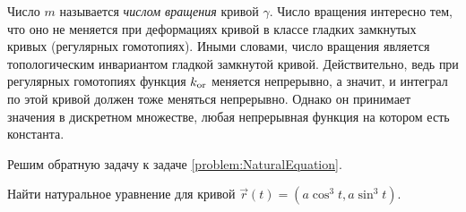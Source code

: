 Число $m$ называется \textit{числом вращения} кривой $\gamma$. Число вращения интересно тем, что оно не меняется при деформациях кривой в классе гладких замкнутых кривых (регулярных гомотопиях). Иными словами, число вращения является топологическим инвариантом гладкой замкнутой кривой. Действительно, ведь при регулярных гомотопиях функция $k_{\mathrm{or}}$ меняется непрерывно, а значит, и интеграл по этой кривой должен тоже меняться непрерывно. Однако он принимает значения в дискретном множестве, любая непрерывная функция на котором есть константа.

%

Решим обратную задачу к задаче \ref{problem:NaturalEquation}.

\begin{problem}
	Найти натуральное уравнение для кривой $\vec{r}(t) = (a\cos^3t, a\sin^3t)$.
\end{problem}

